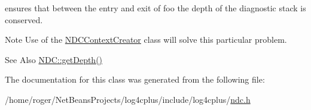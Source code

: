 ensures that between the entry and exit of foo the depth of the diagnostic stack is conserved.

\begin{DoxyNote}{Note}
Use of the \hyperlink{classlog4cplus_1_1NDCContextCreator}{N\-D\-C\-Context\-Creator} class will solve this particular problem.
\end{DoxyNote}
\begin{DoxySeeAlso}{See Also}
\hyperlink{classlog4cplus_1_1NDC_a87b46fd51e682014337868fa7a8d9257}{N\-D\-C\-::get\-Depth()} 
\end{DoxySeeAlso}


The documentation for this class was generated from the following file\-:\begin{DoxyCompactItemize}
\item 
/home/roger/\-Net\-Beans\-Projects/log4cplus/include/log4cplus/\hyperlink{ndc_8h}{ndc.\-h}\end{DoxyCompactItemize}

